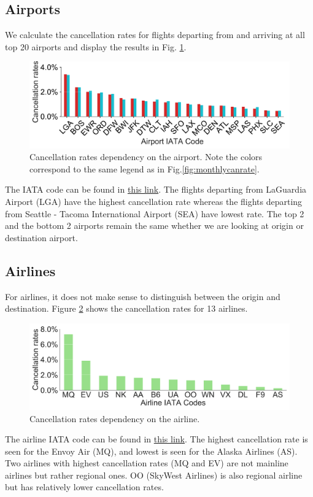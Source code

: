 \documentclass[12pt]{article}
\begin{document}
\subsection{Airports}
\label{subsec:airports}
We calculate the cancellation rates for flights departing from and arriving at all top 20 airports and display the results in Fig. \ref{fig:airportcanrate}. 
\begin{figure}[h!]
\begin{center}
\includegraphics[width=6in]{airport_canrate.pdf}
\end{center}
\caption{\label{fig:airportcanrate}
Cancellation rates dependency on the airport. Note the colors correspond to the same legend as in Fig.\ref{fig:monthlycanrate}.}
\end{figure}
The IATA code can be found in \href{http://www.iata.org/publications/Pages/code-search.aspx}{this link}.
The flights departing from LaGuardia Airport (LGA) have the highest cancellation rate whereas the flights departing from Seattle - Tacoma International Airport (SEA) have lowest rate. The top 2 and the bottom 2 airports remain the same whether we are looking at origin or destination airport. 
\subsection{Airlines}
\label{subsec:airlines}
For airlines, it does not make sense to distinguish between the origin and destination. Figure \ref{fig:airlinecanrate} shows the cancellation rates for 13 airlines.  
\begin{figure}[h!]
\begin{center}
\includegraphics[width=6in]{airline_canrate.pdf}
\end{center}
\caption{\label{fig:airlinecanrate}
Cancellation rates dependency on the airline.}
\end{figure}
The airline IATA code can be found in \href{http://www.iata.org/publications/Pages/code-search.aspx}{this link}. The highest cancellation rate is seen for the Envoy Air (MQ), and lowest is seen for the Alaska Airlines (AS). Two airlines with highest cancellation rates (MQ and EV) are not mainline airlines but rather regional ones. OO (SkyWest Airlines) is also regional airline but has relatively lower cancellation rates.
\end{document}
